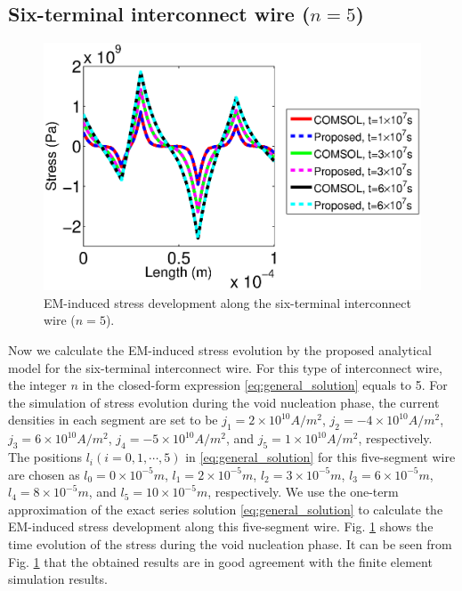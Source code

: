 \subsection{Six-terminal interconnect wire ($n=5$)}
\begin{figure}[!h]
\centering
\includegraphics[width=0.9\columnwidth]{S5StressMatComCompareT0.eps}
\caption{EM-induced stress development along the six-terminal interconnect wire ($n=5$).}
\label{fig:S5StressMatComCompare}
\end{figure}
Now we calculate the EM-induced stress evolution by the proposed analytical model for the six-terminal interconnect wire. For this type of interconnect wire, the integer $n$ in the closed-form expression \eqref{eq:general_solution} equals to 5. For the simulation of stress evolution during the void nucleation phase, the current densities in each segment are set to be $j_1=2\times 10^{10}A/m^2$, $j_2=-4\times 10^{10}A/m^2$, $j_3=6\times 10^{10}A/m^2$, $j_4=-5\times 10^{10}A/m^2$, and $j_5=1\times 10^{10}A/m^2$, respectively. The positions $l_i(i=0,1,\cdots,5)$ in \eqref{eq:general_solution} for this five-segment wire are chosen as $l_0=0\times 10^{-5}m$, $l_1=2\times 10^{-5}m$, $l_2=3\times 10^{-5}m$, $l_3=6\times 10^{-5}m$, $l_4=8\times 10^{-5}m$, and $l_5=10\times 10^{-5}m$, respectively. We use the one-term approximation of the exact series solution \eqref{eq:general_solution} to calculate the EM-induced stress development along this five-segment wire. Fig. \ref{fig:S5StressMatComCompare} shows the time evolution of the stress during the void nucleation phase. It can be seen from Fig. \ref{fig:S5StressMatComCompare} that the obtained results are in good agreement with the finite element simulation results.

